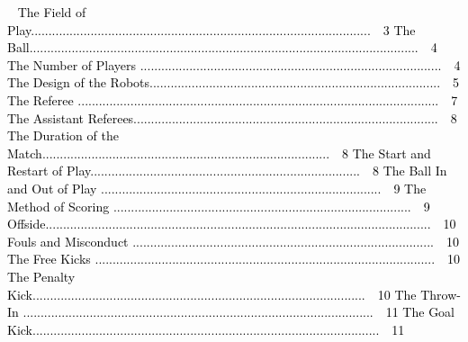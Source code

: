 \documentclass[a4paper]{article}
\begin{document}
\textcolor{black}{\  The Field of
Play.................................................................................................\ \ 3 The
Ball...............................................................................................................\ \ 4 The Number of Players
......................................................................................\ \ 4 The Design of the
Robots...................................................................................\ \ 5 The Referee
.......................................................................................................\ \ 7 The Assistant
Referees.......................................................................................\ \ 8 The Duration of the
Match..................................................................................\ \ 8 The Start and Restart of
Play.............................................................................\ \ 8 The Ball In and Out of Play
................................................................................\ \ 9 The Method of Scoring
.....................................................................................\ \ 9
Offside..............................................................................................................\ \ 10 Fouls and Misconduct
......................................................................................\ \ 10 The Free Kicks
.................................................................................................\ \ 10 The Penalty
Kick...............................................................................................\ \ 10 The Throw-In
....................................................................................................\ \ 11 The Goal
Kick...................................................................................................\ \ 11\newline
}
\end{document}
